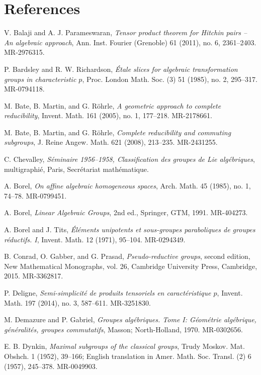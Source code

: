 \documentclass[11pt]{article}
\begin{document}
\section*{References}
\begin{description}[leftmargin=2.7cm,labelwidth=2.2cm,style=nextline]
\item[{[BP]}] V. Balaji and A. J. Parameswaran, \emph{Tensor product theorem for Hitchin pairs -- An algebraic approach}, Ann. Inst. Fourier (Grenoble) 61 (2011), no. 6, 2361--2403. MR-2976315.
\item[{[BR]}] P. Bardsley and R. W. Richardson, \emph{Étale slices for algebraic transformation groups in characteristic \(p\)}, Proc. London Math. Soc. (3) 51 (1985), no. 2, 295--317. MR-0794118.
\item[{[BMR1]}] M. Bate, B. Martin, and G. Röhrle, \emph{A geometric approach to complete reducibility}, Invent. Math. 161 (2005), no. 1, 177--218. MR-2178661.
\item[{[BMR2]}] M. Bate, B. Martin, and G. Röhrle, \emph{Complete reducibility and commuting subgroups}, J. Reine Angew. Math. 621 (2008), 213--235. MR-2431255.
\item[{[Bible]}] C. Chevalley, \emph{Séminaire 1956--1958, Classification des groupes de Lie algébriques}, multigraphié, Paris, Secrétariat mathématique.
\item[{[Bo]}] A. Borel, \emph{On affine algebraic homogeneous spaces}, Arch. Math. 45 (1985), no. 1, 74--78. MR-0799451.
\item[{[Bo2]}] A. Borel, \emph{Linear Algebraic Groups}, 2nd ed., Springer, GTM, 1991. MR-404273.
\item[{[BT]}] A. Borel and J. Tits, \emph{Éléments unipotents et sous-groupes paraboliques de groupes réductifs. I}, Invent. Math. 12 (1971), 95--104. MR-0294349.
\item[{[CGP]}] B. Conrad, O. Gabber, and G. Prasad, \emph{Pseudo-reductive groups}, second edition, New Mathematical Monographs, vol. 26, Cambridge University Press, Cambridge, 2015. MR-3362817.
\item[{[D]}] P. Deligne, \emph{Semi-simplicité de produits tensoriels en caractéristique \(p\)}, Invent. Math. 197 (2014), no. 3, 587--611. MR-3251830.
\item[{[DG]}] M. Demazure and P. Gabriel, \emph{Groupes algébriques. Tome I: Géométrie algébrique, généralités, groupes commutatifs}, Masson; North-Holland, 1970. MR-0302656.
\item[{[Dy]}] E. B. Dynkin, \emph{Maximal subgroups of the classical groups}, Trudy Moskov. Mat. Obshch. 1 (1952), 39--166; English translation in Amer. Math. Soc. Transl. (2) 6 (1957), 245--378. MR-0049903.

\end{description}
\end{document}
